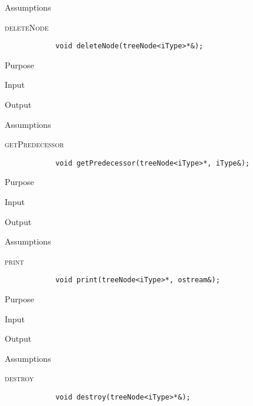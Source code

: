 \documentclass[pdftex, 12pt]{article}
\begin{document}
\begin{description}
\begin{description}
			\item{Assumptions}

		\end{description}
	\item{\textsc{deleteNode}}
		\begin{lstlisting}
			void deleteNode(treeNode<iType>*&);
		\end{lstlisting}
		\begin{description}

			\item{Purpose}

			\item{Input}

			\item{Output}

			\item{Assumptions}

		\end{description}
	\item{\textsc{getPredecessor}}
		\begin{lstlisting}
			void getPredecessor(treeNode<iType>*, iType&);
		\end{lstlisting}
		\begin{description}

			\item{Purpose}

			\item{Input}

			\item{Output}

			\item{Assumptions}

		\end{description}
	\item{\textsc{print}}
		\begin{lstlisting}
			void print(treeNode<iType>*, ostream&);
		\end{lstlisting}
		\begin{description}

			\item{Purpose}

			\item{Input}

			\item{Output}

			\item{Assumptions}

		\end{description}
	\item{\textsc{destroy}}
		\begin{lstlisting}
			void destroy(treeNode<iType>*&);
		\end{lstlisting}
		\begin{description}


\end{description}
\end{description}
\end{document}
